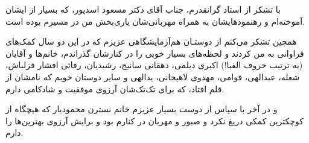 \newpage
{
\vspace*{0.5in}
\Mitra \Large
{}
\setlength{\parindent}{0em}
\setlength{\parskip}{0em}
با تشکر از استاد گرانقدرم، جناب آقای دکتر مسعود اسدپور، که بسیار از ایشان آموخته‌ام و رهنمودهایشان به همراه مهربانی‌شان یاری‌بخش من در مسیرم بوده است.

همچین تشکر می‌کنم از دوستـان هم‌آزمایشگاهی عزیزم که در این دو سال کمک‌های فراوانی به من کردند و لحظه‌های بسیار خوبی را در کنارشان گذراندم، خانم‌ها و آقایان (به ترتیب حروف الفبا!) اکبری دیلمی، دهقانی سانیج، رشیدیان، رفائی افشار قزلباش، شعله، عبدالهی، قوامی، مهدوی لاهیجانی، یدالهی و سایر دوستان خوبم که نامشان از قلم افتاد، که برای تک‌تک‌شان آرزوی موفقیت و شادکامی دارم.

و در آخر با سپاس از دوست بسیار عزیزم خانم نسترن محمودیار که هیچگاه از کوچکترین کمکی دریغ نکرد و صبور و مهربان در کنارم بود و برایش آرزوی بهترین‌ها را دارم.


 
}
\newpage\null\thispagestyle{empty}\newpage
